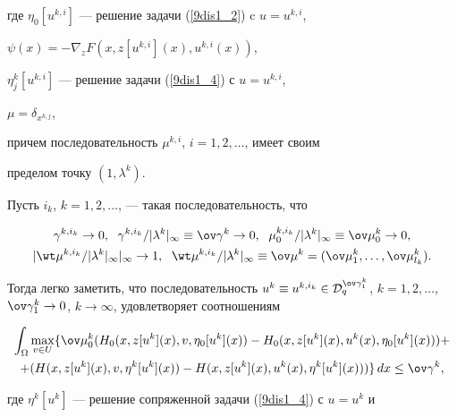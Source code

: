 где $\eta_0[u^{k,i}]$ --- решение задачи (\ref{9dis1_2}) c $u=u^{k,i}$,


$\psi(x)=-\nabla_zF(x,z[u^{k,i}](x),u^{k,i}(x))$,


$\eta_j^k[u^{k,i}]$ --- решение задачи (\ref{9dis1_4}) с $u=u^{k,i}$,


$\mu=\delta_{x^{k,j}}$,


причем последовательность $\mu^{k,i}$, $i=1,2,\dotsc$, имеет своим


пределом точку $(1,\lambda^k)$.





Пусть $i_k$, $k=1,2,\dotsc$, --- такая последовательность, что


\begin{gather*}


\gamma^{k,i_k}\to 0,\ \; \gamma^{k,i_k}/|\lambda^k|_\infty\equiv


\ov\gamma^k\to 0,\ \;


\mu_0^{k,i_k}/|\lambda^k|_\infty\equiv\ov\mu_0^k\to 0, \\


%


|\wt\mu^{k,i_k}/|\lambda^k|_\infty|_\infty\to 1,\ \;


\wt\mu^{k,i_k}/|\lambda^k|_\infty\equiv\ov\mu^k=


(\ov\mu_1^k,\dotsc,\ov\mu_{l_k}^k).


\end{gather*}


Тогда легко заметить, что последовательность $u^k\equiv


u^{k,i_k}\in{\cal D}_q^{\ov\gamma_1^k}$, $k=1,2,\dotsc$, $\ov\gamma_1^k


\to 0$, $k\to\infty$, удовлетворяет соотношениям


\begin{multline*}


\int_\Omega\max_{v\in U}


\{\ov\mu^k_0(H_0(x,z[u^k](x),v,\eta_0[u^k](x))-


H_0(x,z[u^k](x),u^k(x),\eta_0[u^k](x)))+ \\


%


+(H(x,z[u^k](x),v,\eta^k[u^k](x))-


H(x,z[u^k](x),u^k(x),\eta^k[u^k](x)))\}\,dx\leq\ov\gamma^k,


\end{multline*}


где $\eta^k[u^k]$ --- решение сопряженной задачи (\ref{9dis1_4}) с $u=u^k$ и


